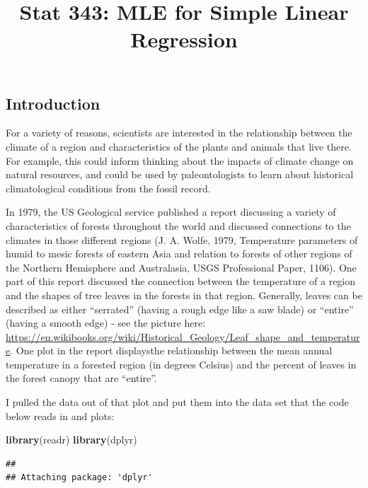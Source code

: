 \documentclass[]{article}
\title{Stat 343: MLE for Simple Linear Regression}
\author{}
\date{}
\newenvironment{Shaded}{\begin{snugshade}}{\end{snugshade}}
\newcommand{\KeywordTok}[1]{\textcolor[rgb]{0.13,0.29,0.53}{\textbf{#1}}}
\newcommand{\NormalTok}[1]{#1}
\begin{document}
\maketitle

\newcommand{\simiid}{{\mathrel {\mathop {\sim}\limits _{}^{\rm iid}}\,}}



\subsection{Introduction}\label{introduction}

For a variety of reasons, scientists are interested in the relationship
between the climate of a region and characteristics of the plants and
animals that live there. For example, this could inform thinking about
the impacts of climate change on natural resources, and could be used by
paleontologists to learn about historical climatological conditions from
the fossil record.

In 1979, the US Geological service published a report discussing a
variety of characteristics of forests throughout the world and discussed
connections to the climates in those different regions (J. A. Wolfe,
1979, Temperature parameters of humid to mesic forests of eastern Asia
and relation to forests of other regions of the Northern Hemisphere and
Australasia, USGS Professional Paper, 1106). One part of this report
discussed the connection between the temperature of a region and the
shapes of tree leaves in the forests in that region. Generally, leaves
can be described as either ``serrated'' (having a rough edge like a saw
blade) or ``entire'' (having a smooth edge) - see the picture here:
\url{https://en.wikibooks.org/wiki/Historical_Geology/Leaf_shape_and_temperature}.
One plot in the report displaysthe relationship between the mean annual
temperature in a forested region (in degrees Celsius) and the percent of
leaves in the forest canopy that are ``entire''.

I pulled the data out of that plot and put them into the data set that
the code below reads in and plots:

\begin{Shaded}
\begin{Highlighting}[]
\KeywordTok{library}\NormalTok{(readr)}
\KeywordTok{library}\NormalTok{(dplyr)}
\end{Highlighting}
\end{Shaded}

\begin{verbatim}
## 
## Attaching package: 'dplyr'
\end{verbatim}
\end{document}
